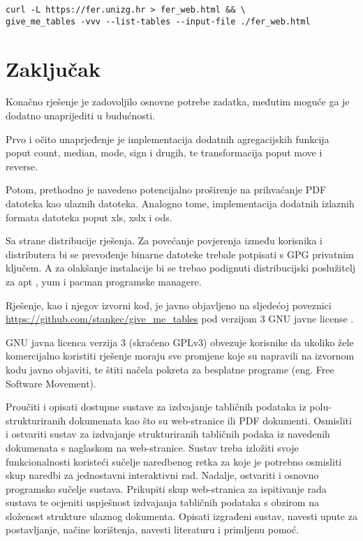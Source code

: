 \documentclass[times, utf8, zavrsni]{fer}
\begin{document}
\begin{lstlisting}
curl -L https://fer.unizg.hr > fer_web.html && \
give_me_tables -vvv --list-tables --input-file ./fer_web.html
\end{lstlisting}



\chapter{Zaključak}

Konačno rješenje je zadovoljilo osnovne potrebe zadatka, međutim moguće ga je
dodatno unaprijediti u budućnosti.

Prvo i očito unaprjeđenje je implementacija dodatnih agregacijskih funkcija
poput count, median, mode, sign i drugih, te transformacija poput move i
reverse.

Potom, prethodno je navedeno potencijalno proširenje na prihvaćanje PDF
datoteka kao ulaznih datoteka. Analogno tome, implementacija dodatnih
izlaznih formata datoteka poput xls, xslx i ods.

Sa strane distribucije rješenja. Za povećanje povjerenja između korisnika i
distributera bi se prevođenje binarne datoteke trebale potpisati s GPG
privatnim ključem. A za olakšanje instalacije bi se trebao podignuti
distribucijski poslužitelj za apt \cite{apt_wiki}, yum \cite{yum_wiki} i
pacman \cite{pacman_wiki} programske managere.

Rješenje, kao i njegov izvorni kod, je javno objavljeno na sljedećoj
poveznici \url{https://github.com/stankec/give_me_tables} pod verzijom 3 GNU
javne license \cite{gplv3_license}.

GNU javna licenca verzija 3 (skraćeno GPLv3) obvezuje korisnike da ukoliko
žele komercijalno koristiti rješenje moraju sve promjene koje su napravili na
izvornom kodu javno objaviti, te štiti načela pokreta za besplatne programe
\cite{free_software_movement_manifesto} (eng. Free Software Movement).





\begin{sazetak}

Proučiti i opisati dostupne sustave za izdvajanje tabličnih podataka iz
polu-strukturiranih dokumenata kao što su web-stranice ili PDF dokumenti.
Osmisliti i ostvariti sustav za izdvajanje strukturiranih tabličnih podaka iz
navedenih dokumenata s naglaskom na web-stranice.
Sustav treba izložiti svoje funkcionalnosti koristeći sučelje naredbenog retka
za koje je potrebno osmisliti skup naredbi za jednostavni interaktivni rad.
Nadalje, ostvariti i osnovno programsko sučelje sustava. Prikupiti skup
web-stranica za ispitivanje rada sustava te ocjeniti uspješnost izdvajanja
tabličnih podataka s obzirom na složenost strukture ulaznog dokumenta. Opisati
izgrađeni sustav, navesti upute za postavljanje, načine korištenja, navesti
literaturu i primljenu pomoć.

\kljucnerijeci{}
\end{sazetak}
\end{document}
